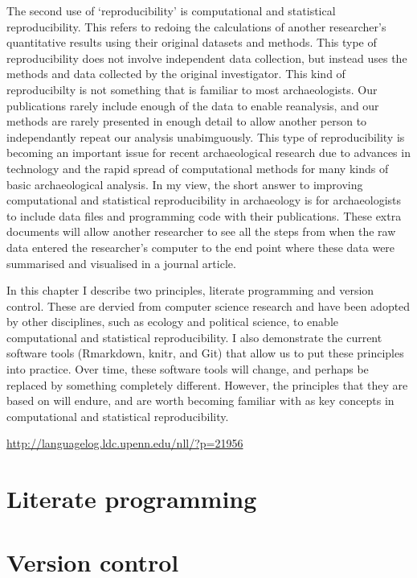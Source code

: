 \documentclass[]{book}
\begin{document}
The second use of `reproducibility' is computational and statistical
reproducibility. This refers to redoing the calculations of another
researcher's quantitative results using their original datasets and
methods. This type of reproducibility does not involve independent data
collection, but instead uses the methods and data collected by the
original investigator. This kind of reproducibilty is not something that
is familiar to most archaeologists. Our publications rarely include
enough of the data to enable reanalysis, and our methods are rarely
presented in enough detail to allow another person to independantly
repeat our analysis unabimguously. This type of reproducibility is
becoming an important issue for recent archaeological research due to
advances in technology and the rapid spread of computational methods for
many kinds of basic archaeological analysis. In my view, the short
answer to improving computational and statistical reproducibility in
archaeology is for archaeologists to include data files and programming
code with their publications. These extra documents will allow another
researcher to see all the steps from when the raw data entered the
researcher's computer to the end point where these data were summarised
and visualised in a journal article.

In this chapter I describe two principles, literate programming and
version control. These are dervied from computer science research and
have been adopted by other disciplines, such as ecology and political
science, to enable computational and statistical reproducibility. I also
demonstrate the current software tools (Rmarkdown, knitr, and Git) that
allow us to put these principles into practice. Over time, these
software tools will change, and perhaps be replaced by something
completely different. However, the principles that they are based on
will endure, and are worth becoming familiar with as key concepts in
computational and statistical reproducibility.

\url{http://languagelog.ldc.upenn.edu/nll/?p=21956}

\section{Literate programming}\label{literate-programming}

\section{Version control}\label{version-control}


\end{document}
